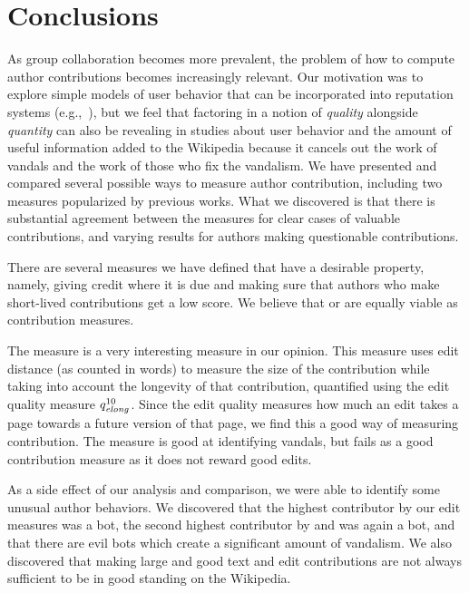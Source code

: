 \section{Conclusions}

As group collaboration becomes more prevalent,
the problem of how to compute author contributions
becomes increasingly relevant.
Our motivation was to explore simple models of user behavior
that can be incorporated into reputation
systems (e.g.,~\cite{Adler2007}),
but we feel that factoring in a notion
of \textit{quality} alongside \textit{quantity}
can also be revealing in studies about
user behavior and the amount of useful information
added to the Wikipedia because it cancels out
the work of vandals and the work of those who
fix the vandalism.
We have presented and compared several possible ways to
measure author contribution, including
two measures popularized by previous works.
What we discovered is that there is substantial
agreement between the measures for clear
cases of valuable contributions, and
varying results for authors making
questionable contributions.

There are several measures we have defined that
have a desirable property, namely, giving credit
where it is due and making sure that authors who make short-lived 
contributions get a low score.
We believe that \textlong or \editlong are
equally viable as contribution measures.

The \editlong measure is a very interesting measure
in our opinion.
This measure uses edit distance (as counted in words)
to measure the size of the contribution while taking into
account the longevity of that contribution, quantified
using the edit quality measure $\quality{elong}{10}{}$.
Since the edit quality measures how much an edit takes a 
page towards a future version of that page, we find this
a good way of measuring contribution.
The \punish measure is good at identifying vandals,
but fails as a good contribution measure as it does not
reward good edits.

As a side effect of our analysis and comparison, we were
able to identify some unusual author behaviors.
We discovered that the highest contributor by our edit 
measures was a bot, the second highest contributor by 
\textlong and \punish was again a bot, and that there 
are evil bots which create a significant amount of vandalism.
We also discovered that making large and good text and edit
contributions are not always sufficient to be in good 
standing on the Wikipedia.


